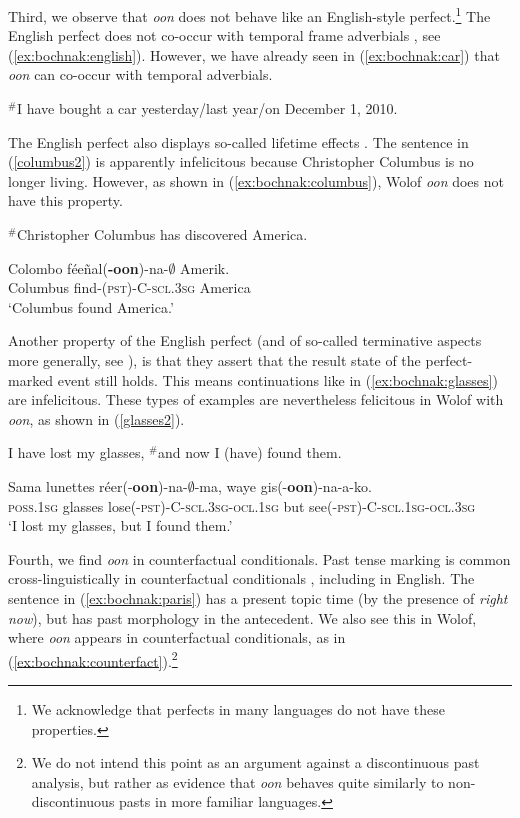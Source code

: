 \documentclass[output=paper,newtxmath,modfonts,nonflat,draftmode]{langsci/langscibook}
\begin{document}
Third, we observe that \textit{oon} does not behave like an English-style perfect.\footnote{We acknowledge that perfects in many languages do not have these properties.} The English perfect does not co-occur with temporal frame adverbials \citep{klein92present}, see (\ref{ex:bochnak:english}). However, we have already seen in (\ref{ex:bochnak:car}) that \textit{oon} can co-occur with temporal adverbials.

\ea\label{ex:bochnak:english}
$^{\#}$I have bought a car yesterday/last year/on December 1, 2010.
\z

The English perfect also displays so-called lifetime effects \citep{mccawley71tense}. The sentence in (\ref{columbus2}) is apparently infelicitous because Christopher Columbus is no longer living. However, as shown in (\ref{ex:bochnak:columbus}), Wolof \textit{oon} does not have this property.

\ea\label{columbus2}
$^{\#}$Christopher Columbus has discovered America.
\z

\ea\label{ex:bochnak:columbus}
\gll Colombo f\'ee\~nal(\textbf{-oon})-na-$\emptyset$ Amerik.\\
Columbus find-(\textsc{pst)-C-scl.3sg} America\\
\glt `Columbus found America.'
\z

Another property of the English perfect (and of so-called terminative aspects more generally, see \citealt{bohnemeyer02grammar}), is that they assert that the result state of the perfect-marked event still holds. This means continuations like in (\ref{ex:bochnak:glasses}) are infelicitous. These types of examples are nevertheless felicitous in Wolof with \textit{oon}, as shown in (\ref{glasses2}).

\ea\label{ex:bochnak:glasses} 
I have lost my glasses, $^{\#}$and now I (have) found them. 
\z

\ea\label{glasses2}
\gll Sama lunettes r\'eer(-\textbf{oon})-na-$\emptyset$-ma, waye gis(-\textbf{oon})-na-a-ko. \\
\textsc{poss.1sg} glasses lose\textsc{(-pst)-C-scl.3sg-ocl.1sg} but see\textsc{(-pst)-C-scl.1sg-ocl.3sg} \\
\glt `I lost my glasses, but I found them.' 
\z

Fourth, we find \textit{oon} in counterfactual conditionals. Past tense marking is common cross-linguistically in counterfactual conditionals \citep{iatridou00grammatical, halpert12aspect}, including in English. The sentence in (\ref{ex:bochnak:paris}) has a present topic time (by the presence of \textit{right now}), but has past morphology in the antecedent. We also see this in Wolof, where \textit{oon} appears in counterfactual conditionals, as in (\ref{ex:bochnak:counterfact}).\footnote{We do not intend this point as an argument against a discontinuous past analysis, but rather as evidence that \textit{oon} behaves quite similarly to non-discontinuous pasts in more familiar languages.}  
\end{document}
